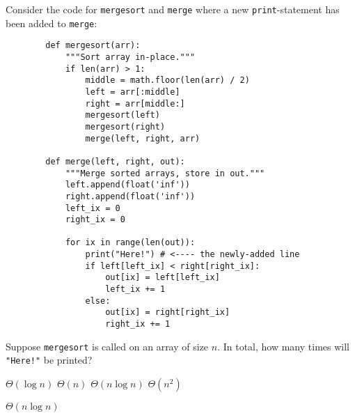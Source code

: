 \begin{prob}

    Consider the code for \texttt{mergesort} and \texttt{merge} where a new
    \texttt{print}-statement has been added to \texttt{merge}:

    \begin{verbatim}
        def mergesort(arr):
            """Sort array in-place."""
            if len(arr) > 1:
                middle = math.floor(len(arr) / 2)
                left = arr[:middle]
                right = arr[middle:]
                mergesort(left)
                mergesort(right)
                merge(left, right, arr)

        def merge(left, right, out):
            """Merge sorted arrays, store in out."""
            left.append(float('inf'))
            right.append(float('inf'))
            left_ix = 0
            right_ix = 0

            for ix in range(len(out)):
                print("Here!") # <---- the newly-added line
                if left[left_ix] < right[right_ix]:
                    out[ix] = left[left_ix]
                    left_ix += 1
                else:
                    out[ix] = right[right_ix]
                    right_ix += 1
    \end{verbatim}

    Suppose \texttt{mergesort} is called on an array of size $n$. In total, how
    many times will \texttt{"Here!"} be printed?

    \begin{choices}
        \choice $\Theta(\log n)$
        \choice $\Theta(n)$
        \correctchoice $\Theta(n \log n)$
        \choice $\Theta(n^2)$
    \end{choices}

    \begin{soln}
        $\Theta(n \log n)$
    \end{soln}

\end{prob}
